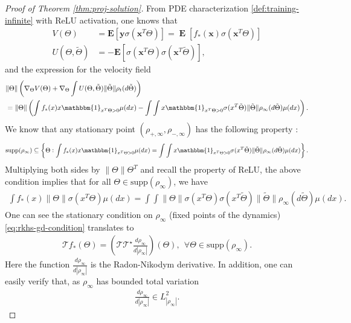 \documentclass[11pt]{article}
\numberwithin{equation}{section}
\def\E{\mathop{\mathbf{E}}}
\def\bd#1{\mathbf{#1}}
\def\bx{\bd{x}}
\begin{document}
\begin{proof}[Proof of Theorem \ref{thm:proj-solution}]
        From PDE characterization \eqref{def:training-infinite} with ReLU activation, one knows that
        \begin{align*}
            V(\Theta) &= \mathbf{E}[\bd{y}\sigma(\bx^T\Theta)] = \E [ f_*(\bx)\sigma(\bx^T\Theta) ]\\
            U(\Theta,\tilde \Theta) &= -\mathbf{E}[\sigma(\bx^T\Theta)\sigma(\bx^T\tilde{\Theta})],
        \end{align*}
        and the expression for the velocity field
        \begin{align*}
            &\|\Theta\| \left( \nabla_{\Theta}V(\Theta)+ \nabla_{\Theta}\int U(\Theta,\tilde\Theta)\|\tilde\Theta\|\rho_t(d \tilde\Theta)\right) \\
            &= \|\Theta\| \left(\int f_*(x) x \mathbbm{1}_{x^T \Theta > 0} \mu(d x) - \int \int x \mathbbm{1}_{x^T \Theta > 0} \sigma(x^T \tilde\Theta) \| \tilde\Theta \| \rho_\infty(d\tilde\Theta)\mu(dx)  \right).
        \end{align*}
        We know that any stationary point $\left( \rho_{+,\infty}, \rho_{-,\infty} \right)$ has the following property \citep{mei2018mean}:
    \begin{align}\label{eq:fix-signed-point}
        \text{supp}(\rho_\infty) \subseteq \left\{ \Theta:  \int f_*(x) x \mathbbm{1}_{x^T \Theta > 0} \mu(d x) = \int \int x \mathbbm{1}_{x^T \Theta > 0} \sigma(x^T \tilde\Theta) \| \tilde\Theta \| \rho_\infty(d\tilde\Theta)\mu(dx) \right\}.
    \end{align}
    Multiplying both sides by $\|\Theta\|\Theta^T$ and recall the property of ReLU, the above condition implies that for all $\Theta \in \text{supp}(\rho_\infty)$, we have
    \begin{align}\label{eq:rkhs-gd-condition}
        \int f_*(x) \| \Theta \| \sigma(x^T \Theta) \mu(d x) = \int \int  \| \Theta \| \sigma(x^T \Theta) \sigma(x^T \tilde\Theta) \| \tilde\Theta \| \rho_\infty(d \tilde\Theta) \mu(dx).
    \end{align}
    One can see the stationary condition on $\rho_\infty$ (fixed points of the dynamics) \eqref{eq:rkhs-gd-condition} translates to 
    \begin{align}
        \label{eq:station-gd}
         \mathcal{T} f_* (\Theta) = \left( \mathcal{T}\mathcal{T}^\star \frac{d\rho_{\infty}}{d|\rho_{\infty}|} \right) (\Theta), ~~\forall \Theta \in \text{supp}(\rho_\infty).
    \end{align}
    Here the function $\frac{d\rho_{\infty}}{d|\rho_\infty|} $ is the Radon-Nikodym derivative. In addition, one can easily verify that, as $\rho_{\infty}$ has bounded total variation
    \begin{align*}
        \frac{d\rho_{\infty}}{d|\rho_\infty|} \in L^2_{|\rho_{\infty}|}. 
    \end{align*}
    

\end{proof}
\end{document}
